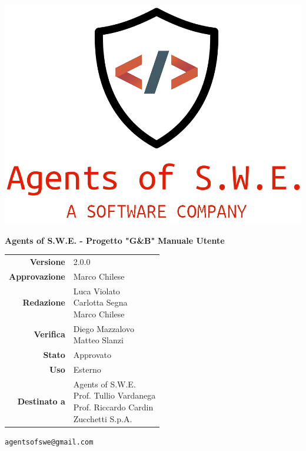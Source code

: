 


\begin{titlepage}
\thispagestyle{empty}

\begin{center}

\includegraphics[scale=0.3]{./images/logo.png} 

\large \textbf{Agents of S.W.E. - Progetto "G\&B"}
\vfill
\Huge \textbf{Manuale Utente}
\vfill
\large
\renewcommand{\arraystretch}{1.3}
\begin{tabular}{r|l}
\textbf{Versione} & 2.0.0\\
\textbf{Approvazione} & Marco Chilese\\
\textbf{Redazione} & \parbox[t]{5cm}{Luca Violato\\Carlotta Segna\\Marco Chilese}\\
\textbf{Verifica} & \parbox[t]{5cm}{Diego Mazzalovo\\Matteo Slanzi}\\
\textbf{Stato} & Approvato\\
\textbf{Uso} & Esterno\\
\textbf{Destinato a} & \parbox[t]{5cm}{Agents of S.W.E. \\Prof. Tullio Vardanega\\Prof. Riccardo Cardin \\ Zucchetti S.p.A.}
\end{tabular}
\vfill
\small
\texttt{agentsofswe@gmail.com}
\end{center}
\end{titlepage}

